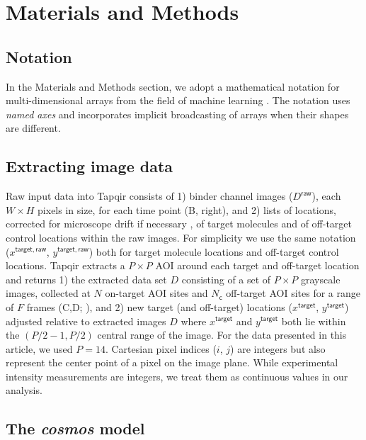 \section{Materials and Methods}

\subsection{Notation} 

In the Materials and Methods section, we adopt a mathematical notation for multi-dimensional arrays from the field of machine learning  \citep{Chiang2021-fi}.  The notation uses \textit{named axes} and incorporates implicit broadcasting of arrays when their shapes are different.

\subsection{Extracting image data} 

Raw input data into Tapqir consists of 1) binder channel images ($D^\mathsf{raw}$), each $W \times H$ pixels in size, for each time point (B, right), and 2)  lists of locations, corrected for microscope drift if necessary \citep{Friedman2015-nx}, of target molecules and of off-target control locations  \citep{Friedman2015-nx} within the raw images. For simplicity we use the same notation ($x^{\mathsf{target}, \mathsf{raw}}$, $y^{\mathsf{target}, \mathsf{raw}}$) both for target molecule locations and off-target control locations. Tapqir extracts a $P \times P$ AOI around each target and off-target location and returns 1) the extracted data set $D$ consisting of a set of $P \times P$ grayscale images, collected at $N$ on-target AOI sites and $N_\mathsf{c}$  off-target AOI sites for a range of $F$ frames (C,D; ), and 2) new target (and off-target) locations ($x^\mathsf{target}$, $y^\mathsf{target}$) adjusted relative to extracted images $D$ where $x^\mathsf{target}$ and $y^\mathsf{target}$ both lie within the $(P/2-1,P/2)$ central range of the image. For the data presented in this article, we used $P = 14$. Cartesian pixel indices ($i$, $j$) are integers but also represent the center point of a pixel on the image plane. While experimental intensity measurements are integers, we treat them as continuous values in our analysis.



\subsection{The \emph{cosmos} model} 

